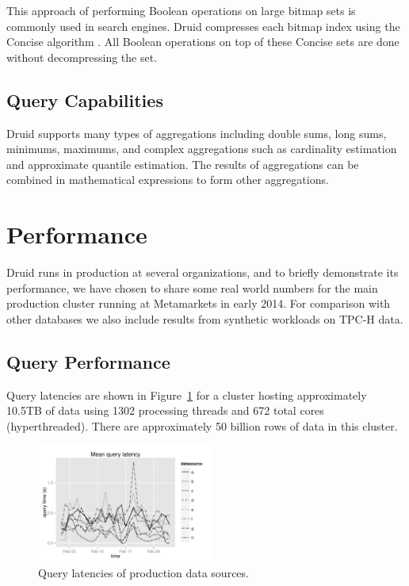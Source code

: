 \documentclass{vldb}
\begin{document}
This approach of performing Boolean operations on large bitmap sets is commonly
used in search engines. Druid compresses each bitmap index using the Concise
algorithm \cite{colantonio2010concise}. All Boolean operations on top of these
Concise sets are done without decompressing the set. 

\subsection{Query Capabilities}
Druid supports many types of aggregations including double sums, long sums,
minimums, maximums, and complex aggregations such as cardinality estimation and
approximate quantile estimation.  The results of aggregations can be combined
in mathematical expressions to form other aggregations. 

\section{Performance}
Druid runs in production at several organizations, and to briefly demonstrate its
performance, we have chosen to share some real world numbers for the main production
cluster running at Metamarkets in early 2014. For comparison with other databases
we also include results from synthetic workloads on TPC-H data.

\subsection{Query Performance}
Query latencies are shown in Figure~\ref{fig:query_latency} for a cluster
hosting approximately 10.5TB of data using 1302 processing threads and 672
total cores (hyperthreaded). There are approximately 50 billion rows of data in
this cluster.

\begin{figure}
\centering
\includegraphics[width = 2.3in]{avg_query_latency}
\caption{Query latencies of production data sources.}
\label{fig:query_latency}
\end{figure}
\end{document}
